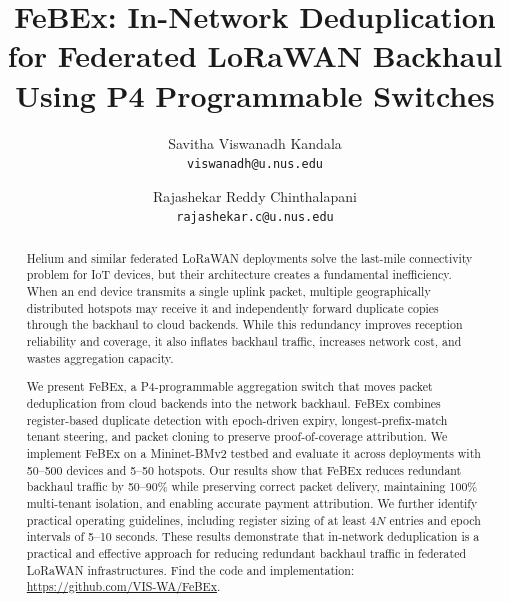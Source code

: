 \documentclass[9pt]{article}
\title{FeBEx: In-Network Deduplication for Federated LoRaWAN Backhaul Using P4 Programmable Switches}
\author{
Savitha Viswanadh Kandala\\
\small{\texttt{
viswanadh@u.nus.edu
}}
\and
Rajashekar Reddy Chinthalapani\\
\small{\texttt{
rajashekar.c@u.nus.edu
}}
}
\date{}
\begin{document}
\maketitle
\vspace{-8mm}
\begin{abstract}
Helium and similar federated LoRaWAN deployments solve the last-mile connectivity problem for IoT devices, but their architecture creates a fundamental inefficiency. When an end device transmits a single uplink packet, multiple geographically distributed hotspots may receive it and independently forward duplicate copies through the backhaul to cloud backends. While this redundancy improves reception reliability and coverage, it also inflates backhaul traffic, increases network cost, and wastes aggregation capacity.

We present FeBEx, a P4-programmable aggregation switch that moves packet deduplication from cloud backends into the network backhaul. FeBEx combines register-based duplicate detection with epoch-driven expiry, longest-prefix-match tenant steering, and packet cloning to preserve proof-of-coverage attribution. We implement FeBEx on a Mininet-BMv2 testbed and evaluate it across deployments with 50--500 devices and 5--50 hotspots. Our results show that FeBEx reduces redundant backhaul traffic by 50--90\% while preserving correct packet delivery, maintaining 100\% multi-tenant isolation, and enabling accurate payment attribution. We further identify practical operating guidelines, including register sizing of at least $4N$ entries and epoch intervals of 5--10 seconds. These results demonstrate that in-network deduplication is a practical and effective approach for reducing redundant backhaul traffic in federated LoRaWAN infrastructures. Find the code and implementation: \url{https://github.com/VIS-WA/FeBEx}.
\end{abstract}
\begingroup
\renewcommand{\thefootnote}{}
\addtocounter{footnote}{-1}
\endgroup

% 




% 


\appendix




\end{document}
